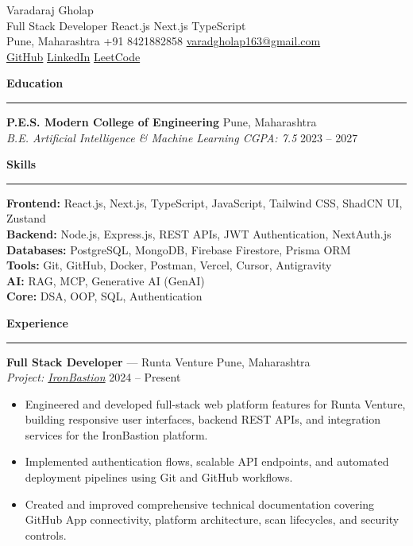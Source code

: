 \documentclass[10pt,a4paper]{article}
\newcommand{\cvsection}[1]{%
  \vspace{5pt}%
  {\large\bfseries #1}%
  \vspace{2pt}\hrule\vspace{4pt}%
}
\begin{document}
\begin{center}
    {\huge Varadaraj Gholap}\\[2pt]
    Full Stack Developer \;\textbar\; React.js \;\textbar\; Next.js \;\textbar\; TypeScript\\[2pt]
    Pune, Maharashtra \;\textbar\; +91 8421882858 \;\textbar\; \href{mailto:varadgholap163@gmail.com}{varadgholap163@gmail.com}\\[2pt]
    \href{https://github.com/Varad163}{GitHub} \;\textbar\; \href{https://www.linkedin.com/in/varadraj-gholap-04a42228/}{LinkedIn} \;\textbar\; \href{https://leetcode.com/u/Varad163/}{LeetCode}
\end{center}

\vspace{-6pt}

\cvsection{Education}

\textbf{P.E.S. Modern College of Engineering} \hfill Pune, Maharashtra\\
\textit{B.E. Artificial Intelligence \& Machine Learning \;\textbar\; CGPA: 7.5} \hfill 2023 -- 2027

\cvsection{Skills}

\textbf{Frontend:} React.js, Next.js, TypeScript, JavaScript, Tailwind CSS, ShadCN UI, Zustand\\[2pt]
\textbf{Backend:} Node.js, Express.js, REST APIs, JWT Authentication, NextAuth.js\\[2pt]
\textbf{Databases:} PostgreSQL, MongoDB, Firebase Firestore, Prisma ORM\\[2pt]
\textbf{Tools:} Git, GitHub, Docker, Postman, Vercel, Cursor, Antigravity\\[2pt]
\textbf{AI:} RAG, MCP, Generative AI (GenAI)\\[2pt]
\textbf{Core:} DSA, OOP, SQL, Authentication

\cvsection{Experience}

\textbf{Full Stack Developer} --- Runta Venture \hfill Pune, Maharashtra\\
\textit{Project: \href{http://13.232.3.52/}{IronBastion}} \hfill 2024 -- Present
\begin{itemize}[label=--, noitemsep, topsep=2pt, parsep=0pt, partopsep=0pt, leftmargin=1.2em]
    \item Engineered and developed full-stack web platform features for Runta Venture, building responsive user interfaces, backend REST APIs, and integration services for the IronBastion platform.
    \item Implemented authentication flows, scalable API endpoints, and automated deployment pipelines using Git and GitHub workflows.
    \item Created and improved comprehensive technical documentation covering GitHub App connectivity, platform architecture, scan lifecycles, and security controls.
\end{itemize}
\end{document}

